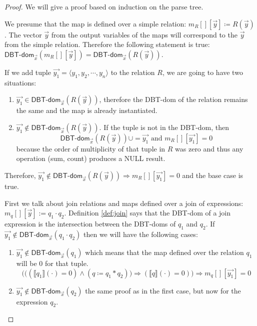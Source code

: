 \documentclass[12pt]{article}
\newcommand{\dom}{\textsf{DBT-dom}}
\begin{document}
\begin{proof}
We will give a proof based on induction on the parse tree.

We presume that the map is defined over a simple relation: $m_R[][\vec{y}]\coloneqq R(\vec{y})$. The vector $\vec{y}$ from the output variables of the maps will correspond to the $\vec{y}$ from the simple relation. Therefore the following statement is true: $\dom{}_{\vec{x}}(m_R[][\vec{y}])=\dom{}_{\vec{x}}(R(\vec{y}))$.

If we add tuple $\vec{y_1}=\langle y_1,y_2,\cdots,y_n\rangle$ to the relation $R$, we are going to have two situations:
\begin{enumerate}
\item $\vec{y_1}\in\dom{}_{\vec{x}}(R(\vec{y}))$, therefore the \dom{} of the relation remains the same and the map is already instantiated.
\item $\vec{y_1}\notin\dom{}_{\vec{x}}(R(\vec{y}))$. If the tuple is not in the \dom{}, then $$\dom{}_{\vec x}(R(\vec y))\cup=\vec{y_1}\mbox{ and }m_{R}[][\vec{y_1}]=0$$ because the order of multiplicity of that tuple in $R$ was zero and thus any operation (sum, count) produces a NULL result.
\end{enumerate}
Therefore, $\vec{y_1}\notin\dom{}_{\vec{x}}(R(\vec{y}))\Rightarrow m_R[][\vec{y_1}]=0$ and the base case is true.

First we talk about join relations and maps defined over a join of expressions: $m_q[][\vec{y}]:=q_1\cdot q_2$. Definition \ref{def:join} says that the \dom{} of a join expression is the intersection between the \dom{}s of $q_1$ and $q_2$. If $\vec{y_1}\notin\dom{}_{\vec{x}}(q_1\cdot q_2)$ then we will have the following cases:
\begin{enumerate}
\item $\vec{y_1}\notin\dom{}_{\vec{x}}(q_1)$ which means that the map defined over the relation $q_1$ will be 0 for that tuple.
\begin{equation}
\Big(\big((\llbracket q_{1}\rrbracket(\cdot)=0)\land (q\coloneqq q_{1}*q_{2})\big)\Rightarrow (\llbracket q\rrbracket(\cdot)=0)\Big)\Rightarrow m_{q}[][\vec{y_{1}}]=0
\end{equation}
\item $\vec{y_{1}}\notin\dom{}_{\vec{x}}(q_2)$ the same proof as in the first case, but now for the expression $q_2$.
\end{enumerate}


\end{proof}
\end{document}
